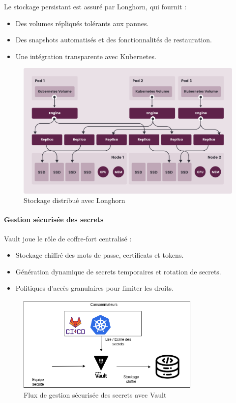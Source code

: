 {Le stockage persistant est assuré par Longhorn, qui fournit :
\begin{itemize}
	\item Des volumes répliqués tolérants aux pannes.
	\item Des snapshots automatisés et des fonctionnalités de restauration.
	\item Une intégration transparente avec Kubernetes.
\end{itemize}

\begin{figure} [H]
	\centering
	\includegraphics[width=.5\textwidth]{figures/how-longhorn-works.png}
	\caption{Stockage distribué avec Longhorn}
\end{figure}

\paragraph{\textbf{Gestion sécurisée des secrets}}

Vault joue le rôle de coffre-fort centralisé :
\begin{itemize}
	\item Stockage chiffré des mots de passe, certificats et tokens.
	\item Génération dynamique de secrets temporaires et rotation de secrets.
	\item Politiques d’accès granulaires pour limiter les droits.
\end{itemize}

\begin{figure}[H]
	\centering
	\includegraphics[width=0.8\textwidth]{figures/vault-gestion-secrets.png}
	\caption{Flux de gestion sécurisée des secrets avec Vault}
\end{figure}

}

